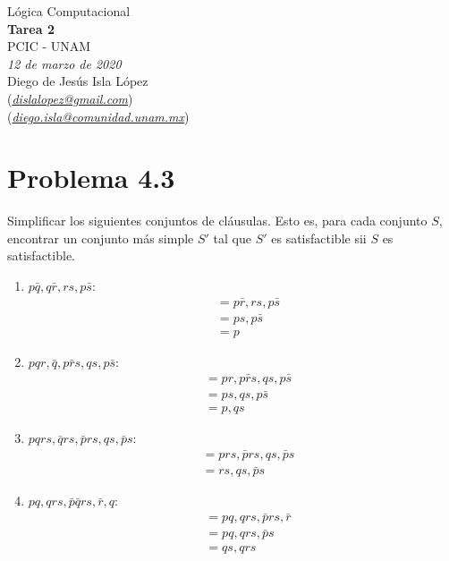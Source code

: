 \documentclass[letterpaper,12pt]{article}
\theoremstyle{definition}
\begin{document}
\begin{center}
  {\large Lógica Computacional}\\
  \vspace{0.2cm}
  {\large\bfseries Tarea 2}\\
  \vspace{0.2cm}
  {\large PCIC - UNAM}\\
  \vspace{0.5cm}
  {\itshape 12 de marzo de 2020}\\
  \vspace{0.5cm}
  Diego de Jesús Isla López\\
  (\href{mailto:dislalopez@gmail.com}{\itshape dislalopez@gmail.com})\\
  (\href{mailto:diego.isla@comunidad.unam.mx}{\itshape diego.isla@comunidad.unam.mx})\\
\end{center}


\section*{Problema 4.3}

Simplificar los siguientes conjuntos de cláusulas. Esto es, para cada conjunto \(S\), encontrar un conjunto más simple \(S'\) tal que  \(S'\) es satisfactible sii  \(S\) es satisfactible.

\begin{enumerate}
  \item \(p\bar{q}, q\bar{r}, rs, p\bar{s}\):
    \begin{align*}
      &=  p \bar{r}, rs, p \bar{s}\\
      &=  ps, p \bar{s}\\
      &=  p
    \end{align*}
  \item \(pqr, \bar{q}, p\bar{r}s, qs, p\bar{s}\):
    \begin{align*}
      &=  pr, p\bar{r}s, qs, p\bar{s}\\
      &=  ps, qs, p\bar{s}\\
      &=  p, qs
    \end{align*}
  \item \(pqrs, \bar{q}rs, \bar{p}rs, qs, \bar{p}s\):
    \begin{align*}
      &=  prs, \bar{p}rs, qs, \bar{p}s\\
      &= rs, qs, \bar{p}s
    \end{align*}
  \item \(pq, qrs, \bar{p}\bar{q}rs, \bar{r}, q\):
  \begin{align*}
    &= pq, qrs, \bar{p}rs, \bar{r}\\
    &=  pq, qrs, \bar{p}s\\
    &=  qs, qrs
  \end{align*}
\end{enumerate}
\end{document}
